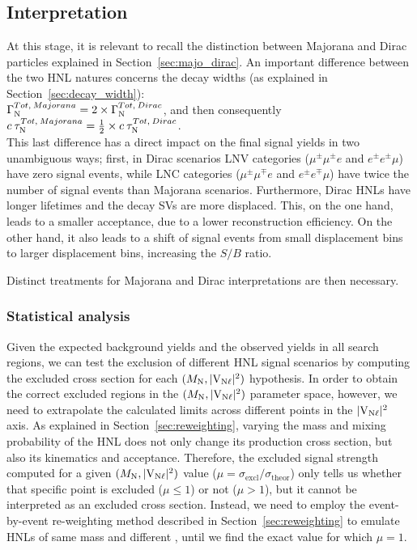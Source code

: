 \subsection{Interpretation}
At this stage, it is relevant to recall the distinction between
Majorana and Dirac particles explained
in Section~\ref{sec:majo_dirac}.
An important difference between the two HNL
natures concerns the decay widths (as explained
in Section~\ref{sec:decay_width}):\\
$\Gamma^{Tot, \: Majorana}_{\mathrm{N}} = 2 \times \Gamma^{Tot, \:Dirac}_{\mathrm{N}}$,
and then consequently
$c\:\tau^{Tot, \: Majorana}_{\mathrm{N}} = \frac{1}{2} \times c\:\tau^{Tot, \: Dirac}_{\mathrm{N}}
$.\\
This last difference has a direct impact on the final signal yields in
two unambiguous ways; first, in Dirac scenarios LNV categories ($\mu^{\pm}\mu^{\pm} e$ and $e^{\pm}e^{\pm}\mu$)
have zero signal events, while LNC categories
($\mu^{\pm}\mu^{\mp} e$ and $e^{\pm}e^{\mp}\mu$) have twice the
number of signal events than Majorana scenarios.
Furthermore, Dirac HNLs have longer lifetimes and the decay SVs
are more displaced. This, on the one hand, leads to a smaller
acceptance, due to a lower
reconstruction efficiency. On the other hand, it also leads to a shift of signal
events from small displacement bins to larger displacement bins,
increasing the $S/B$ ratio.

Distinct treatments for Majorana and Dirac interpretations are then necessary.
\subsubsection{Statistical analysis}
Given the expected background yields and the observed yields in all
search regions, we can test the exclusion of different HNL signal 
scenarios by computing the excluded cross section
for each $(M_{\mathrm{N}},\mathrm{|V_{\mathrm{N}\ell}|^2})$ hypothesis.
In order to obtain the correct excluded regions in the
$(M_{\mathrm{N}},\mathrm{|V_{\mathrm{N}\ell}|^2})$ parameter space, however, we need to extrapolate the
calculated limits across different points in the
$\mathrm{|V_{\mathrm{N}\ell}|^2}$ axis.
As explained in Section~\ref{sec:reweighting}, varying the mass and mixing
probability of the HNL does not only change its production cross
section, but also its kinematics and acceptance.
Therefore, the excluded signal strength computed for a given
$(M_{\mathrm{N}},\mathrm{|V_{\mathrm{N}\ell}|^2})$ value
($\mu=\sigma_{\mathrm{excl}}/\sigma_{\mathrm{theor}}$) only tells us
whether that specific point is excluded ($\mu\leq 1$) or not
($\mu>1$), but it cannot be interpreted as an excluded cross section.
Instead, we need to employ the event-by-event re-weighting method
described in Section~\ref{sec:reweighting} to emulate HNLs of same mass and
different \mixpar, until we find the exact \mixpar value for which
$\mu=1$.\\


